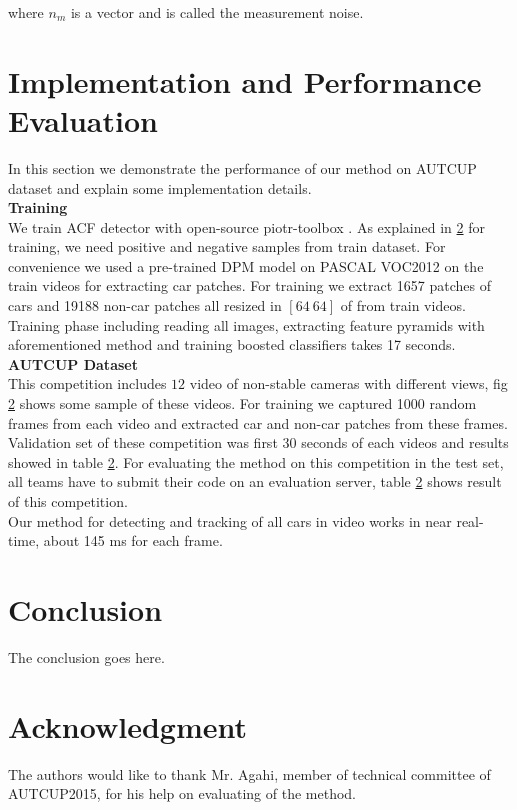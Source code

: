 \documentclass[conference]{IEEEtran}
\begin{document}
where $n_m$ is a vector and is called the measurement noise. 


\section{Implementation and Performance Evaluation}
In this section we demonstrate the performance of our method on AUTCUP dataset and explain some implementation details.\\
\textbf{Training} \\
We train ACF detector with open-source piotr-toolbox \cite{PMT}. As explained in \ref{} for training, we need positive and negative samples from train dataset. For convenience we used a pre-trained DPM model on PASCAL VOC2012 on the train videos for extracting car patches. For training we extract 1657 patches of cars and 19188 non-car patches all resized in $[64\ 64]$ of from train videos. Training phase including reading all images, extracting feature pyramids with aforementioned method and training boosted classifiers takes 17 seconds.
\\
\textbf{AUTCUP Dataset} \\
This competition includes $12$ video of non-stable cameras with different views, fig \ref{} shows some sample of these videos. For training we captured 1000 random frames from each video and extracted car and non-car patches from these frames. Validation set of these competition was first 30 seconds of each videos and results showed in table \ref{}. For evaluating the method on this competition in the test set, all teams have to submit their code on an evaluation server, table \ref{} shows result of this competition. \\
Our method for detecting and tracking of all cars in video works in near real-time, about 145 ms for each frame.

\section{Conclusion}
The conclusion goes here.






\section*{Acknowledgment}


The authors would like to thank Mr. Agahi, member of technical committee of AUTCUP2015, for his help on evaluating of the method.




\end{document}
